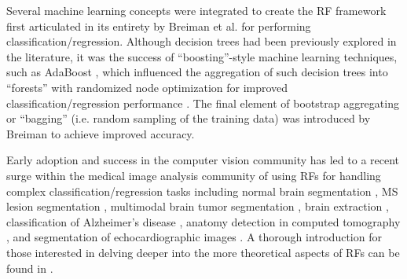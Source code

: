 Several machine learning concepts were integrated to create 
the RF framework first articulated in its entirety by Breiman
et al. \citep{breiman2001} for performing classification/regression.  
Although decision trees had been previously explored in the literature, 
it was the success of ``boosting''-style machine learning 
techniques, such as AdaBoost \citep{schapire1990,freund1997}, which influenced 
the aggregation of such decision trees into ``forests'' 
with randomized node optimization for improved
classification/regression performance \citep{ho1995,amit1997}.
The final element of bootstrap aggregating or ``bagging'' (i.e.
random sampling of the training data) was
introduced by Breiman \citep{breiman1996} to achieve improved
accuracy.%

Early adoption \citep{viola2005} and success in the
computer vision community
has led to a recent surge within the medical image analysis
community of using RFs for handling complex 
classification/regression tasks including
normal brain segmentation \citep{yi2009},
MS lesion segmentation \cite{geremia2011}, 
multimodal brain tumor segmentation
\citep{bauer2012,zikic2012}, brain extraction \citep{iglesias2010}, 
classification of Alzheimer's disease \citep{gray2013},
anatomy detection in computed tomography \citep{criminisi2013}, and
segmentation of echocardiographic images \citep{verhoek2011}. 
A thorough introduction for those interested in delving deeper 
into the more theoretical aspects of RFs can be found
in \cite{criminisi2011}.



